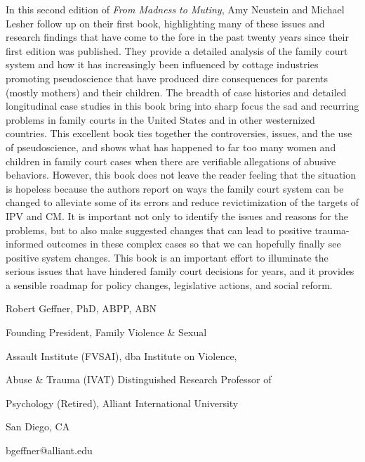 In this second edition of \textit{From Madness to Mutiny}, Amy Neustein
and Michael Lesher follow up on their first book, highlighting many
of these issues and research findings that have come to the fore in the
past twenty years since their first edition was published. They provide
a detailed analysis of the family court system and how it has increasingly been influenced by cottage industries promoting pseudoscience
that have produced dire consequences for parents (mostly mothers) and
their children. The breadth of case histories and detailed longitudinal
case studies in this book bring into sharp focus the sad and recurring
problems in family courts in the United States and in other westernized
countries. This excellent book ties together the controversies, issues, and
the use of pseudoscience, and shows what has happened to far too many
women and children in family court cases when there are verifiable allegations of abusive behaviors. However, this book does not leave the
reader feeling that the situation is hopeless because the authors report
on ways the family court system can be changed to alleviate some of
its errors and reduce revictimization of the targets of IPV and CM. It is
important not only to identify the issues and reasons for the problems,
but to also make suggested changes that can lead to positive trauma-informed outcomes in these complex cases so that we can hopefully
finally see positive system changes. This book is an important effort
to illuminate the serious issues that have hindered family court decisions for years, and it provides a sensible roadmap for policy changes,
legislative actions, and social reform. \pfl{}

\hfill{}Robert Geffner, PhD, ABPP, ABN

\hfill{}Founding President, Family Violence \& Sexual

\hfill{}Assault Institute (FVSAI), dba Institute on Violence,

\hfill{}Abuse \& Trauma (IVAT) Distinguished Research Professor of

\hfill{}Psychology (Retired), Alliant International University

\hfill{}San Diego, CA

\hfill{}bgeffner@alliant.edu



